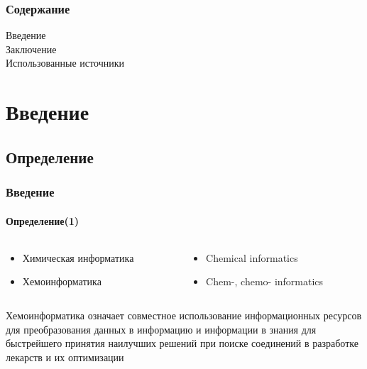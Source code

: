 



\thispagestyle{empty}

\begin{frame}
  \maketitle
\end{frame}

\setcounter{page}{1}

\begin{frame}
  \frametitle{Содержание} 
  Введение \\[0.3cm]
  \tableofcontents
  Заключение \\[0.3cm]
  Использованные источники
\end{frame}

\section*{Введение}
\subsection{Определение}

\begin{frame}
  \frametitle{Введение}
  \framesubtitle{Определение(1)}

  \begin{columns}
    \begin{column}{0.5\textwidth}
       \begin{itemize}
         \item Химическая информатика
         \item Хемоинформатика
       \end{itemize}
    \end{column}
    \begin{column}{0.5\textwidth}
       \begin{itemize}
         \item Chemical informatics
         \item Chem-, chemo- informatics
       \end{itemize}
    \end{column}
  \end{columns}

  \begin{defn}[Ф.К.Браун, 1998]
     Хемоинформатика означает совместное использование информационных ресурсов для преобразования данных
     в информацию и информации в знания для быстрейшего принятия наилучших решений при поиске соединений
     в разработке лекарств и их оптимизации 
  \end{defn}

\end{frame}

